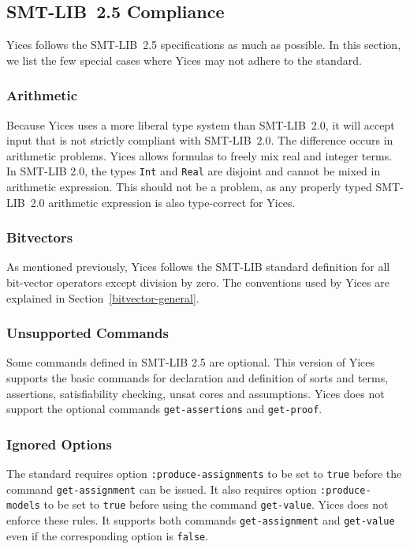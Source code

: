 \documentclass[11pt,twoside,fleqn,openright,titlepage]{cslreport}
\begin{document}
\subsection{SMT-LIB~2.5 Compliance}

Yices follows the SMT-LIB~2.5 specifications as much as possible. In
this section, we list the few special cases where Yices may not adhere
to the standard.

\subsubsection*{Arithmetic}

Because Yices uses a more liberal type system than SMT-LIB~2.0, it
will accept input that is not strictly compliant with SMT-LIB~2.0. The
difference occurs in arithmetic problems. Yices allows formulas to
freely mix real and integer terms. In SMT-LIB 2.0, the types
\texttt{Int} and \texttt{Real} are disjoint and cannot be mixed in
arithmetic expression. This should not be a problem, as any properly
typed SMT-LIB~2.0 arithmetic expression is also type-correct for
Yices.


\subsubsection*{Bitvectors}

As mentioned previously, Yices follows the SMT-LIB standard definition
for all bit-vector operators except division by zero. The conventions
used by Yices are explained in Section~\ref{bitvector-general}.

\subsubsection*{Unsupported Commands}

Some commands defined in SMT-LIB 2.5 are optional. This version of
Yices supports the basic commands for declaration and definition of
sorts and terms, assertions, satisfiability checking, unsat cores and
assumptions. Yices does not support the optional commands
\texttt{get-assertions} and \texttt{get-proof}.

\subsubsection*{Ignored Options}

The standard requires option \texttt{:produce-assignments} to be set
to \texttt{true} before the command \texttt{get-assignment} can be
issued.  It also requires option \texttt{:produce-models} to be set to
\texttt{true} before using the command \texttt{get-value}. Yices does
not enforce these rules. It supports both commands
\texttt{get-assignment} and \texttt{get-value} even if the
corresponding option is \texttt{false}.
\end{document}
